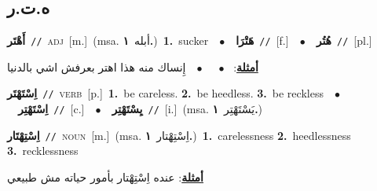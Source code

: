 \documentclass[10pt,a4paper,twoside]{article} %
\begin{document}
\begin{multicols}{2}
\vspace{-3mm}
\subsection*{\color{blue}\foreignlanguage{arabic}{ه.ت.ر}\color{blue}{}} 

{\setlength\topsep{0pt}\textbf{\foreignlanguage{arabic}{أَهْتَر}}\ {\color{gray}\texttt{//}\color{black}}\ \textsc{adj}\ [m.]\ \color{gray}(msa. \foreignlanguage{arabic}{أبله}~\foreignlanguage{arabic}{\textbf{١.}})\color{black}\ \textbf{1.}~sucker\ \ $\bullet$\ \ \setlength\topsep{0pt}\textbf{\foreignlanguage{arabic}{هَتْرَا}}\ {\color{gray}\texttt{//}\color{black}}\ [f.]\ \ $\bullet$\ \ \setlength\topsep{0pt}\textbf{\foreignlanguage{arabic}{هُتُر}}\ {\color{gray}\texttt{//}\color{black}}\ [pl.]\  \begin{flushright}\color{gray}\foreignlanguage{arabic}{\textbf{\underline{\foreignlanguage{arabic}{أمثلة}}}: \ $\bullet$\ \  \ $\bullet$\ \  إِنساك منه هذا اهتر بعرفش اشي بالدنيا}\end{flushright}\color{black}} \vspace{2mm}

{\setlength\topsep{0pt}\textbf{\foreignlanguage{arabic}{اِسْتَهْتَر}}\ {\color{gray}\texttt{//}\color{black}}\ \textsc{verb}\ [p.]\ \textbf{1.}~be careless.  \textbf{2.}~be heedless.  \textbf{3.}~be reckless\ \ $\bullet$\ \ \setlength\topsep{0pt}\textbf{\foreignlanguage{arabic}{اِسْتَهْتِر}}\ {\color{gray}\texttt{//}\color{black}}\ [c.]\ \ $\bullet$\ \ \setlength\topsep{0pt}\textbf{\foreignlanguage{arabic}{يِسْتَهْتِر}}\ {\color{gray}\texttt{//}\color{black}}\ [i.]\ \color{gray}(msa. \foreignlanguage{arabic}{يَسْتَهْتِر}~\foreignlanguage{arabic}{\textbf{١.}})\color{black}\ } \vspace{2mm}

{\setlength\topsep{0pt}\textbf{\foreignlanguage{arabic}{اِسْتِهْتَار}}\ {\color{gray}\texttt{//}\color{black}}\ \textsc{noun}\ [m.]\ \color{gray}(msa. \foreignlanguage{arabic}{اِسْتِهْتار}~\foreignlanguage{arabic}{\textbf{١.}})\color{black}\ \textbf{1.}~carelessness  \textbf{2.}~heedlessness  \textbf{3.}~recklessness\  \begin{flushright}\color{gray}\foreignlanguage{arabic}{\textbf{\underline{\foreignlanguage{arabic}{أمثلة}}}: عنده اِسْتِهْتار بأمور حياته مش طبيعي}\end{flushright}\color{black}} \vspace{2mm}


\end{multicols}
\end{document}

